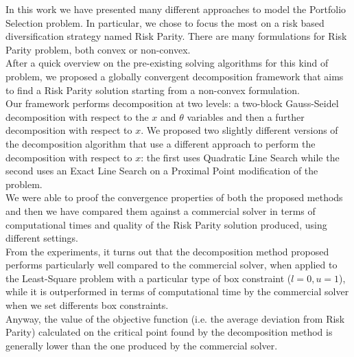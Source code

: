 In this work we have presented many different approaches to model the Portfolio Selection problem. In particular, we chose to focus the most on a risk based diversification strategy named Risk Parity. There are many formulations for Risk Parity problem, both convex or non-convex.\\ After a quick overview on the pre-existing solving algorithms for this kind of problem, we proposed a globally convergent decomposition framework that aims to find a Risk Parity solution starting from a non-convex formulation.\\ Our framework performs decomposition at two levels: a two-block Gauss-Seidel decomposition with respect to the $x$ and $\theta$ variables and then a further decomposition with respect to $x$. We proposed two slightly different versions of the decomposition algorithm that use a different approach to perform the decomposition with respect to $x$: the first uses Quadratic Line Search while the second uses an Exact Line Search on a Proximal Point modification of the problem.\\ We were able to proof the convergence properties of both the proposed methods and then we have compared them against a commercial solver in terms of computational times and quality of the Risk Parity solution produced, using different settings.\\From the experiments, it turns out that the decomposition method proposed performs particularly well compared to the commercial solver, when applied to the Least-Square problem with a particular type of box constraint ($l=0, u=1$), while it is outperformed in terms of computational time by the commercial solver when we set differents box constraints.\\ Anyway, the value of the objective function (i.e. the average deviation from Risk Parity) calculated on the critical point found by the decomposition method is generally lower than the one produced by the commercial solver. 

